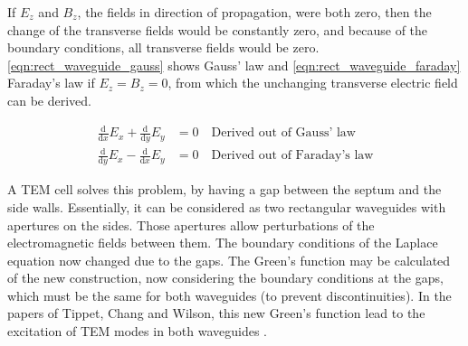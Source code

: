If $E_z$ and $B_z$, the fields in direction of propagation, were both zero, then the change of the transverse fields would be constantly zero, and because of the boundary conditions, all transverse fields would be zero. \autoref{eqn:rect_waveguide_gauss} shows Gauss' law and \autoref{eqn:rect_waveguide_faraday} Faraday's law if $E_z=B_z=0$, from which the unchanging transverse electric field can be derived. 

\begin{align}
    \frac{\mathrm{d}}{\mathrm{d}x}E_x+\frac{\mathrm{d}}{\mathrm{d}y}E_y&=0\quad\text{Derived out of Gauss' law}\label{eqn:rect_waveguide_gauss}\\
    \frac{\mathrm{d}}{\mathrm{d}y}E_x-\frac{\mathrm{d}}{\mathrm{d}x}E_y&=0\quad\text{Derived out of Faraday's law}\label{eqn:rect_waveguide_faraday}
\end{align}

A TEM cell solves this problem, by having a gap between the septum and the side walls. Essentially, it can be considered as two rectangular waveguides with apertures on the sides. Those apertures allow perturbations of the electromagnetic fields between them. The boundary conditions of the Laplace equation now changed due to the gaps. The Green's function may be calculated of the new construction, now considering the boundary conditions at the gaps, which must be the same for both waveguides (to prevent discontinuities). In the papers of Tippet, Chang and Wilson, this new Green's function lead to the excitation of TEM modes in both waveguides \cite{Tippet_Chang_Crawford_1976,Wilson_1981}.




